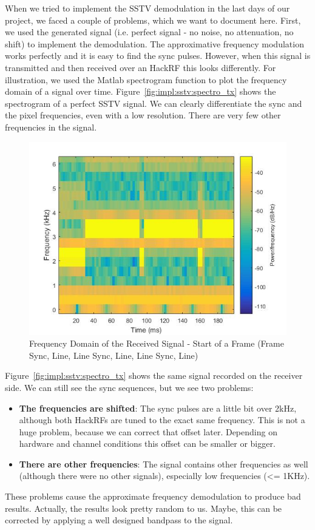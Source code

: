 When we tried to implement the SSTV demodulation in the last days of our project, we faced a couple of problems, which we want to document here. First, we used the generated signal (i.e. perfect signal - no noise, no attenuation, no shift) to implement the demodulation. The approximative frequency modulation works perfectly and it is easy to find the sync pulses. However, when this signal is transmitted and then received over an HackRF this looks differently. For illustration, we used the Matlab spectrogram function to plot the frequency domain of a signal over time. Figure~\ref{fig:impl:sstv:spectro_tx} shows the spectrogram of a perfect \ac{SSTV} signal. We can clearly differentiate the sync and the pixel frequencies, even with a low resolution. There are very few other frequencies in the signal. 

\begin{figure}[!htbp]
	\centering
	\includegraphics[width=1.0\linewidth]{gfx/sstv_rxside.jpg}
	\caption{Frequency Domain of the Received Signal - Start of a Frame (Frame Sync, Line, Line Sync, Line, Line Sync, Line)}
	\label{fig:impl:sstv:spectro_rx}
\end{figure}

Figure~\ref{fig:impl:sstv:spectro_tx} shows the same signal recorded on the receiver side. We can still see the sync sequences, but we see two problems: 
\begin{itemize}
	\item \textbf{The frequencies are shifted}: The sync pulses are a little bit over 2kHz, although both HackRFs are tuned to the exact same frequency. This is not a huge problem, because we can correct that offset later. Depending on hardware and channel conditions this offset can be smaller or bigger. 
	\item \textbf{There are other frequencies}: The signal contains other frequencies as well (although there were no other signals), especially low frequencies (<= 1KHz). 
\end{itemize}

These problems cause the approximate frequency demodulation to produce bad results. Actually, the results look pretty random to us. Maybe, this can be corrected by applying a well designed bandpass to the signal. 

